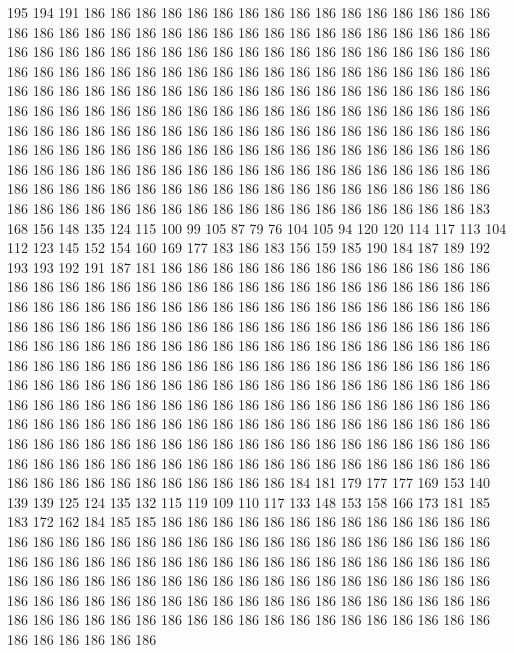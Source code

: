 195 194 191 186 186 186 186 186 186 186 186 186 186 186 186 186 186 186 186 186
186 186 186 186 186 186 186 186 186 186 186 186 186 186 186 186 186 186 186 186
186 186 186 186 186 186 186 186 186 186 186 186 186 186 186 186 186 186 186 186
186 186 186 186 186 186 186 186 186 186 186 186 186 186 186 186 186 186 186 186
186 186 186 186 186 186 186 186 186 186 186 186 186 186 186 186 186 186 186 186
186 186 186 186 186 186 186 186 186 186 186 186 186 186 186 186 186 186 186 186
186 186 186 186 186 186 186 186 186 186 186 186 186 186 186 186 186 186 186 186
186 186 186 186 186 186 186 186 186 186 186 186 186 186 186 186 186 186 186 186
186 186 186 186 186 186 186 186 186 186 186 186 186 186 186 186 186 186 186 186
186 186 186 186 186 186 186 186 186 186 186 186 186 186 186 186 186 186 186 186
186 186 186 186 186 186 186 186 183 168 156 148 135 124 115 100 99 105 87 79
76 104 105 94 120 120 114 117 113 104 112 123 145 152 154 160 169 177 183 186
183 156 159 185 190 184 187 189 192 193 193 192 191 187 181 186 186 186 186 186
186 186 186 186 186 186 186 186 186 186 186 186 186 186 186 186 186 186 186 186
186 186 186 186 186 186 186 186 186 186 186 186 186 186 186 186 186 186 186 186
186 186 186 186 186 186 186 186 186 186 186 186 186 186 186 186 186 186 186 186
186 186 186 186 186 186 186 186 186 186 186 186 186 186 186 186 186 186 186 186
186 186 186 186 186 186 186 186 186 186 186 186 186 186 186 186 186 186 186 186
186 186 186 186 186 186 186 186 186 186 186 186 186 186 186 186 186 186 186 186
186 186 186 186 186 186 186 186 186 186 186 186 186 186 186 186 186 186 186 186
186 186 186 186 186 186 186 186 186 186 186 186 186 186 186 186 186 186 186 186
186 186 186 186 186 186 186 186 186 186 186 186 186 186 186 186 186 186 186 186
186 186 186 186 186 186 186 186 186 186 186 186 186 186 186 186 186 186 186 186
186 186 186 186 186 186 186 186 186 184 181 179 177 177 169 153 140 139 139 125
124 135 132 115 119 109 110 117 133 148 153 158 166 173 181 185 183 172 162 184
185 185 186 186 186 186 186 186 186 186 186 186 186 186 186 186 186 186 186 186
186 186 186 186 186 186 186 186 186 186 186 186 186 186 186 186 186 186 186 186
186 186 186 186 186 186 186 186 186 186 186 186 186 186 186 186 186 186 186 186
186 186 186 186 186 186 186 186 186 186 186 186 186 186 186 186 186 186 186 186
186 186 186 186 186 186 186 186 186 186 186 186 186 186 186 186 186 186 186 186
186 186 186 186 186 186 186 186 186 186 186 186 186 186 186 186
